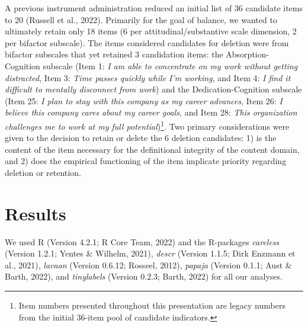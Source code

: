 \documentclass[
  man]{apa6}
\begin{document}
A previous instrument administration reduced an initial list of 36 candidate items to 20 (Russell et al., 2022). Primarily for the goal of balance, we wanted to ultimately retain only 18 items (6 per attitudinal/substantive scale dimension, 2 per bifactor subscale). The items considered candidates for deletion were from bifactor subscales that yet retained 3 candidation items: the Absorption-Cognition subscale (Item 1: \emph{I am able to concentrate on my work without getting distracted}, Item 3: \emph{Time passes quickly while I'm working}, and Item 4: \emph{I find it difficult to mentally disconnect from work}) and the Dedication-Cognition subscale (Item 25: \emph{I plan to stay with this company as my career advances}, Item 26: \emph{I believe this company cares about my career goals}, and Item 28: \emph{This organization challenges me to work at my full potential})\footnote{Item numbers presented throughout this presentation are legacy numbers from the initial 36-item pool of candidate indicators.}. Two primary considerations were given to the decision to retain or delete the 6 deletion candidates: 1) is the content of the item necessary for the definitional integrity of the content domain, and 2) does the empirical functioning of the item implicate priority regarding deletion or retention.

\hypertarget{results}{%
\section{Results}\label{results}}

We used R (Version 4.2.1; R Core Team, 2022) and the R-packages \emph{careless} (Version 1.2.1; Yentes \& Wilhelm, 2021), \emph{descr} (Version 1.1.5; Dirk Enzmann et al., 2021), \emph{lavaan} (Version 0.6.12; Rosseel, 2012), \emph{papaja} (Version 0.1.1; Aust \& Barth, 2022), and \emph{tinylabels} (Version 0.2.3; Barth, 2022) for all our analyses.
\end{document}
